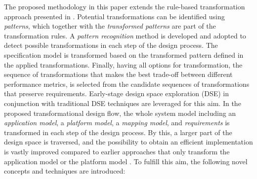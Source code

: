 
The proposed methodology in this paper extends the rule-based transformation approach presented in \cite{sander2004system}. Potential transformations can be identified using \emph{patterns}, which together with the \emph{transformed patterns} are part of the transformation rules.
A \emph{pattern recognition} method is developed and adopted to detect possible transformations in each step of the design process. The specification model is transformed based on the transformed pattern defined in the applied transformations. Finally, having all options for transformation, the sequence of transformations that makes the best trade-off between different performance metrics, is selected from the candidate sequences of transformations that preserve requirements. Early-stage design space exploration (DSE) in conjunction with traditional DSE techniques are leveraged for this aim.
In the proposed transformational design flow, the whole system model including an \emph{application model}, a \emph{platform model}, a \emph{mapping model}, and  \emph{requirements} is transformed in each step of the design process. By this, a larger part of the design space is traversed, and the possibility to obtain an efficient implementation is vastly improved compared to earlier approaches that only transform the application model \cite{sander2004system} or the platform model \cite{nuzzo2015platform}. To fulfill this aim, the following novel concepts and techniques are introduced:

